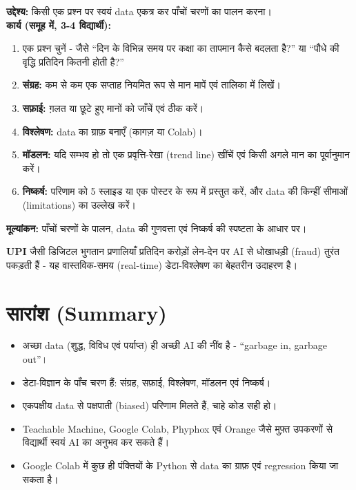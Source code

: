 \begin{pariyojana}
\textbf{उद्देश्य:} किसी एक प्रश्न पर स्वयं data एकत्र कर पाँचों चरणों का पालन करना।\\[4pt]
\textbf{कार्य (समूह में, 3-4 विद्यार्थी):}
\begin{enumerate}[leftmargin=1.6em]
  \item एक प्रश्न चुनें - जैसे “दिन के विभिन्न समय पर कक्षा का तापमान कैसे बदलता है?”
        या “पौधे की वृद्धि प्रतिदिन कितनी होती है?”
  \item \textbf{संग्रह:} कम से कम एक सप्ताह नियमित रूप से मान मापें एवं तालिका में लिखें।
  \item \textbf{सफ़ाई:} ग़लत या छूटे हुए मानों को जाँचें एवं ठीक करें।
  \item \textbf{विश्लेषण:} data का ग्राफ़ बनाएँ (कागज़ या Colab)।
  \item \textbf{मॉडलन:} यदि सम्भव हो तो एक प्रवृत्ति-रेखा (trend line) खींचें एवं किसी
        अगले मान का पूर्वानुमान करें।
  \item \textbf{निष्कर्ष:} परिणाम को 5 स्लाइड या एक पोस्टर के रूप में प्रस्तुत करें,
        और data की किन्हीं सीमाओं (limitations) का उल्लेख करें।
\end{enumerate}
\textbf{मूल्यांकन:} पाँचों चरणों के पालन, data की गुणवत्ता एवं निष्कर्ष की स्पष्टता
के आधार पर।
\end{pariyojana}

\begin{bharatai}
\textbf{UPI} जैसी डिजिटल भुगतान प्रणालियाँ प्रतिदिन करोड़ों लेन-देन पर AI से धोखाधड़ी
(fraud) तुरंत पकड़ती हैं - यह वास्तविक-समय (real-time) डेटा-विश्लेषण का बेहतरीन उदाहरण है।
\end{bharatai}

\section*{सारांश (Summary)}
\begin{itemize}[leftmargin=1.4em]
  \item अच्छा data (शुद्ध, विविध एवं पर्याप्त) ही अच्छी AI की नींव है -
        “garbage in, garbage out”।
  \item डेटा-विज्ञान के पाँच चरण हैं: संग्रह, सफ़ाई, विश्लेषण, मॉडलन एवं निष्कर्ष।
  \item एकपक्षीय data से पक्षपाती (biased) परिणाम मिलते हैं, चाहे कोड सही हो।
  \item Teachable Machine, Google Colab, Phyphox एवं Orange जैसे मुफ़्त उपकरणों से
        विद्यार्थी स्वयं AI का अनुभव कर सकते हैं।
  \item Google Colab में कुछ ही पंक्तियों के Python से data का ग्राफ़ एवं regression
        किया जा सकता है।
\end{itemize}


